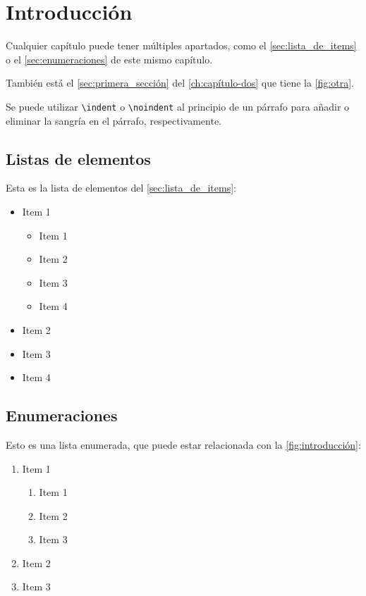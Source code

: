 \chapter{Introducción}
\label{ch:introducción}

Cualquier capítulo puede tener múltiples apartados, como el \autoref{sec:lista_de_items} o el \autoref{sec:enumeraciones} de este mismo capítulo.

También está el \autoref{sec:primera_sección} del \autoref{ch:capítulo-dos} que tiene la \autoref{fig:otra}.

Se puede utilizar \verb|\indent| o \verb|\noindent| al principio de un párrafo para añadir o eliminar la sangría en el párrafo, respectivamente.

\section{Listas de elementos}
\label{sec:lista_de_items}

Esta es la lista de elementos del \autoref{sec:lista_de_items}:

\begin{itemize}
    \item Item 1
    \begin{itemize}
        \item Item 1
        \item Item 2
        \item Item 3
        \item Item 4
    \end{itemize}
    
    \item Item 2
    \item Item 3
    \item Item 4
\end{itemize}

\section{Enumeraciones}
\label{sec:enumeraciones}

Esto es una lista enumerada, que puede estar relacionada con la \autoref{fig:introducción}:

\begin{enumerate}
    \item Item 1
    \begin{enumerate}
        \item Item 1
        \item Item 2
        \item Item 3
    \end{enumerate}
    \item Item 2
    \item Item 3
\end{enumerate}

